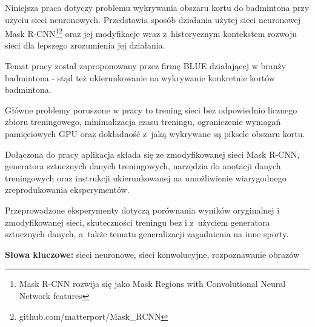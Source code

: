 Niniejsza praca dotyczy problemu wykrywania obszaru kortu do badmintona przy użyciu sieci neuronowych.
Przedstawia sposób działania użytej sieci neuronowej Mask R-CNN\footnote{Mask R-CNN rozwija się jako Mask Regions with Convolutional Neural Network features}\footnote{github.com/matterport/Mask\_RCNN} oraz jej modyfikacje wraz z~historycznym kontekstem rozwoju sieci dla lepszego zrozumienia jej działania.

Temat pracy został zaproponowany przez firmę BLUE działającej w branży badmintona - stąd też ukierunkowanie na wykrywanie konkretnie kortów badmintona.

Główne problemy poruszone w pracy to trening sieci bez odpowiednio licznego zbioru treningowego, minimalizacja czasu treningu, ograniczenie wymagań pamięciowych GPU oraz dokładność z~jaką wykrywane są piksele obszaru kortu.

Dołączona do pracy aplikacja składa się ze zmodyfikowanej sieci Mask R-CNN, generatora sztucznych danych treningowych, narzędzia do anotacji danych treningowych oraz instrukcji ukierunkowanej na umożliwienie wiarygodnego zreprodukowania eksperymentów.

Przeprowadzone eksperymenty dotyczą porównania wyników oryginalnej i zmodyfikowanej sieci, skuteczności treningu bez i z~użyciem generatora sztucznych danych, a~także tematu generalizacji zagadnienia na inne sporty.
\\


\noindent \textbf{Słowa kluczowe:} sieci neuronowe, sieci konwolucyjne, rozpoznawanie obrazów
